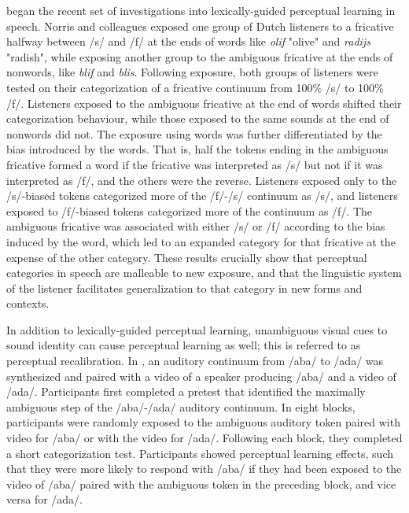 \citet{Norris2003} began the recent set of investigations into lexically-guided perceptual learning in speech.
Norris and colleagues exposed one group of Dutch listeners to a fricative halfway between /s/ and /f/ at the ends of words like \emph{olif} "olive" and \emph{radijs} "radish", while exposing another group to the ambiguous fricative at the ends of nonwords, like \emph{blif} and \emph{blis}.
Following exposure, both groups of listeners were tested on their categorization of a fricative continuum from 100\% /s/ to 100\% /f/. 
Listeners exposed to the ambiguous fricative at the end of words shifted their categorization behaviour, while those exposed to the same sounds at the end of nonwords did not.  The exposure using words was further differentiated by the bias introduced by the words.  That is, half the tokens ending in the ambiguous fricative formed a word if the fricative was interpreted as /s/ but not if it was interpreted as /f/, and the others were the reverse.  
Listeners exposed only to the /s/-biased tokens categorized more of the /f/-/s/ continuum as /s/, and listeners exposed to /f/-biased tokens categorized more of the continuum as /f/.  
The ambiguous fricative was associated with either /s/ or /f/ according to the bias induced by the word, which led to an expanded category for that fricative at the expense of the other category.
These results crucially show that perceptual categories in speech are malleable to new exposure, and that the linguistic system of the listener facilitates generalization to that category in new forms and contexts.

In addition to lexically-guided perceptual learning, unambiguous visual cues to sound identity can cause perceptual learning as well; this is referred to as perceptual recalibration.
In \citet{Bertelson2003}, an auditory continuum from /aba/ to /ada/ was synthesized and paired with a video of a speaker producing /aba/ and a video of /ada/.  
Participants first completed a pretest that identified the maximally ambiguous step of the /aba/-/ada/ auditory continuum. 
In eight blocks, participants were randomly exposed to the ambiguous auditory token paired with video for /aba/ or with the video for /ada/.  Following each block, they completed a short categorization test.  
Participants showed perceptual learning effects, such that they were more likely to respond with /aba/ if they had been exposed to the video of /aba/ paired with the ambiguous token in the preceding block, and vice versa for /ada/.

